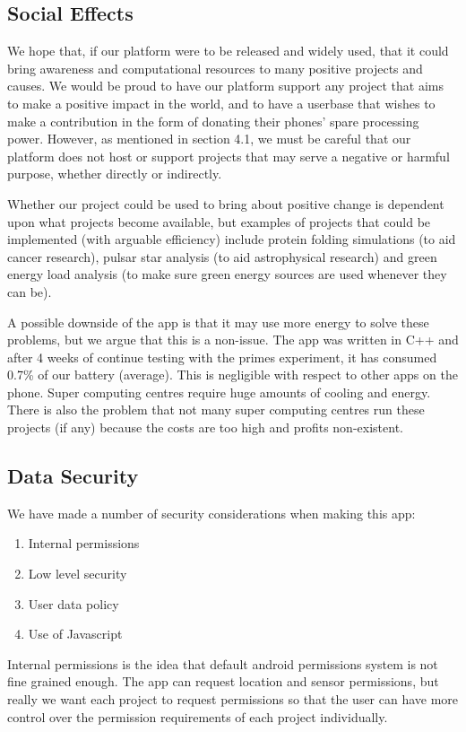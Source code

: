 \documentclass{article}
\begin{document}
\subsection{Social Effects}
We hope that, if our platform were to be released and widely used, that it could bring awareness and computational resources to many positive
projects and causes. We would be proud to have our platform support any project that aims to make a positive impact in the world, and to have
a userbase that wishes to make a contribution in the form of donating their phones’ spare processing power. However, as mentioned in section
4.1, we must be careful that our platform does not host or support projects that may serve a negative or harmful purpose, whether directly or
indirectly.

Whether our project could be used to bring about positive change is dependent upon what projects become available, but examples of projects
that could be implemented (with arguable efficiency) include protein folding simulations (to aid cancer research), pulsar star analysis
(to aid astrophysical research) and green energy load analysis (to make sure green energy sources are used whenever they can be).

A possible downside of the app is that it may use more energy to solve these problems, but we argue that this is a non-issue. The app was
written in C++ and after 4 weeks of continue testing with the primes experiment, it has consumed 0.7\% of our battery (average). This is
negligible with respect to other apps on the phone. Super computing centres require huge amounts of cooling and energy. There is also the
problem that not many super computing centres run these projects (if any) because the costs are too high and profits non-existent.

\subsection{Data Security}
We have made a number of security considerations when making this app:
\begin{enumerate}
  \item{Internal permissions}
	\item{Low level security}
  \item{User data policy}
  \item{Use of Javascript}
\end{enumerate}
Internal permissions is the idea that default android permissions system is not fine grained enough. The app can request location and sensor
permissions, but really we want each project to request permissions so that the user can have more control over the permission requirements of
each project individually.
\end{document}
